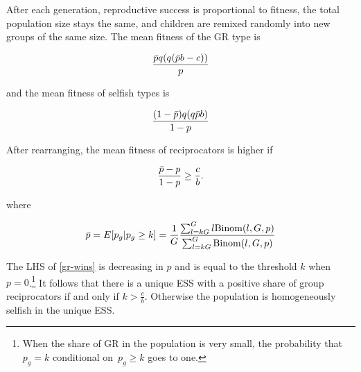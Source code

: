 \documentclass[12pt,a4paper]{article}
\begin{document}
After each generation, reproductive success is proportional to fitness, the total population size stays the same, and children are remixed randomly into new groups of the same size.
%
The mean fitness of the GR type is

\begin{equation*}
\frac{
  \bar{p} q(q(\bar{p} b - c))
}{
  p
}
\end{equation*}

and the mean fitness of selfish types is

\begin{equation*}
\frac{
  (1 - \bar{p})q(q\bar{p} b)
}{
  1 - p
}
\end{equation*}

After rearranging, the mean fitness of reciprocators is higher if


\begin{equation}
\label{gr-wins}
\frac{ \bar{p} - p}{ 1 - p} \ge \frac{c}{b}.
\end{equation}

where 

\[
\bar{p} = E[p_g | p_g \ge k] = \frac{1}{G} \frac{\sum_{l=kG}^G l \mathrm{Binom}(l,G,p)}{\sum_{l=kG}^G \mathrm{Binom}(l,G,p)}
\]

The LHS of \eqref{gr-wins} is decreasing in $p$ and is equal
to the threshold $k$ when $p = 0$.\footnote{
    When the share of GR in the population is very small, the probability that$p_g = k$ conditional on~$p_g\geq k$ goes to one.
}
%
It follows that there is a unique ESS with a positive share of group
reciprocators if and only if $k > \frac{c}{b}$. Otherwise the population is homogeneously selfish in the unique ESS.
\end{document}
